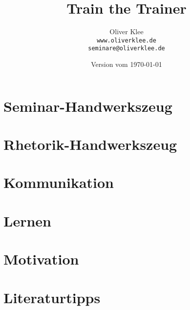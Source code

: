 \documentclass[a4paper,openany,twoside,titlepage,10pt,headsepline]{scrbook}
\title{Train the Trainer}
\author{Oliver Klee\\\texttt{www.oliverklee.de}\\\texttt{seminare@oliverklee.de}}
\date{Version vom \today}
\begin{document}
\frontmatter

\maketitle

\tableofcontents

\mainmatter

\chapter{Seminar-Handwerkszeug}










\chapter{Rhetorik-Handwerkszeug}




\chapter{Kommunikation}






\chapter{Lernen}







\chapter{Motivation}





\backmatter

\chapter{Literaturtipps}
\end{document}
